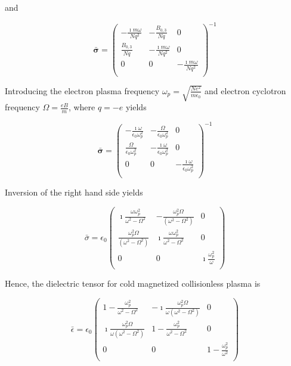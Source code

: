 \documentclass[a4paper,11pt]{thesis}
\begin{document}
and

\begin{equation}
    \mathbf{\bar{\sigma}} = \left(
\begin{array}{ccc}
  - \frac{\imath m \omega }{Nq^2} & -\frac{B_{0,3}}{Nq} & 0 \\
  \frac{B_{0,3}}{Nq} & - \frac{\imath m \omega }{Nq^2} & 0 \\
  0 & 0 & - \frac{\imath m \omega }{Nq^2} \\
\end{array}
\right)^{-1}
\end{equation}

Introducing the electron plasma frequency $\omega_p=\sqrt{\frac{Ne^2}{m \epsilon_0}}$ and electron cyclotron frequency $\Omega=\frac{eB}{m}$, where $q=-e$ yields

\begin{equation}
    \mathbf{\bar{\sigma}} = \left(
\begin{array}{ccc}
  - \frac{\imath  \omega }{\epsilon_0 \omega_p^2} & -\frac{ \Omega}{\epsilon_0 \omega_p^2} & 0 \\
  \frac{ \Omega}{\epsilon_0 \omega_p^2}  &  - \frac{\imath  \omega }{\epsilon_0 \omega_p^2} & 0 \\
  0 & 0 &  - \frac{\imath  \omega }{\epsilon_0 \omega_p^2} \\
\end{array}
\right)^{-1}
\end{equation}

Inversion of the right hand side yields

\begin{equation}
 \bar{\sigma}=\epsilon_0\left(%
 \begin{array}{ccc}
 \imath \frac{\omega \omega_p^2}{\omega^2 -\Omega^2} & -\frac{\omega_p^2 \Omega}{(\omega^2-\Omega^2)} & 0 \\
  \frac{\omega_p^2 \Omega}{(\omega^2-\Omega^2)} & \imath \frac{\omega \omega_p^2}{\omega^2 -\Omega^2} & 0 \\
 0 & 0 & \imath \frac{\omega_p^2}{\omega} \\
 \end{array}
  \right)
  \end{equation}

Hence, the dielectric tensor for cold magnetized collisionless plasma is

\begin{equation}
 \label{gyrotropic_tensor3_collless}
 \bar{\epsilon}=\epsilon_0\left(%
 \begin{array}{ccc}
 1-\frac{\omega_p^2}{\omega^2 -\Omega^2} & -\imath \frac{\omega_p^2 \Omega}{\omega(\omega^2-\Omega^2)} & 0 \\
 \imath \frac{\omega_p^2 \Omega}{\omega(\omega^2-\Omega^2)} & 1-\frac{\omega_p^2}{\omega^2 -\Omega^2} & 0 \\
 0 & 0 & 1-\frac{\omega_p^2}{\omega^2} \\
 \end{array}
  \right)
  \end{equation}
\end{document}
